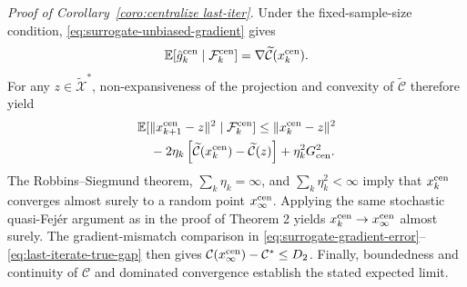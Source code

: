 \documentclass[twocolumn]{autart}    %
\newcommand{\brk}[1]{\left[#1\right]}
\newcommand{\1}{\mathbf{1}}
\begin{document}
\textit{Proof of Corollary~\ref{coro:centralize last-iter}.}
Under the fixed-sample-size condition, \eqref{eq:surrogate-unbiased-gradient} gives
\begin{equation*}
\mathbb E[\hat g_k^{\rm cen}\mid\mathcal F_k^{\rm cen}]
=\nabla\widetilde{\mathcal C}(x_k^{\rm cen}).
\end{equation*}
For any $z\in\widetilde{\mathcal X}^{\ast}$, non-expansiveness of the projection and convexity of $\widetilde{\mathcal C}$ therefore yield
\begin{align*}
&\mathbb E[\|x_{k+1}^{\rm cen}-z\|^2\mid\mathcal F_k^{\rm cen}]
\leq\|x_k^{\rm cen}-z\|^2\\
&\quad-2\eta_k\brk{\widetilde{\mathcal C}(x_k^{\rm cen})
-\widetilde{\mathcal C}(z)}
+\eta_k^2G_{\rm cen}^2.
\end{align*}
The Robbins--Siegmund theorem, $\sum_k\eta_k=\infty$, and $\sum_k\eta_k^2<\infty$ imply that $x_k^{\rm cen}$ converges almost surely to a random point $x_\infty^{\rm cen}$. Applying the same stochastic quasi-Fejér argument as in the proof of Theorem 2 yields $x_k^{\rm cen}\to x_\infty^{\rm cen}$ almost surely.
The gradient-mismatch comparison in \eqref{eq:surrogate-gradient-error}--\eqref{eq:last-iterate-true-gap} 
then gives $\mathcal C(x_\infty^{\rm cen})-\mathcal C^\ast\leq D_2$.  
Finally, boundedness and continuity of $\mathcal C$ and dominated convergence establish the stated expected limit.
 
\end{document}
